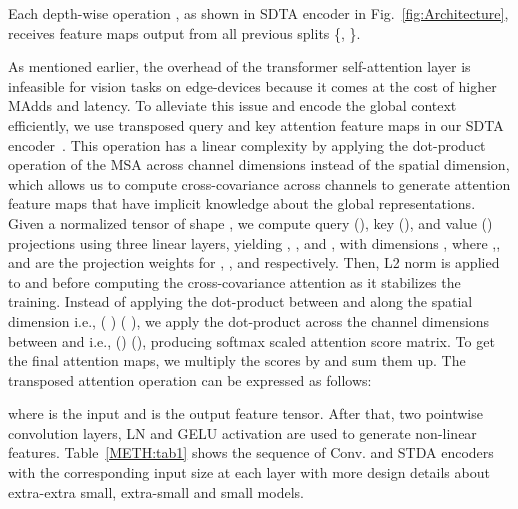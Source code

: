 \documentclass[runningheads]{llncs}
\begin{document}
Each depth-wise operation , as shown in SDTA encoder in Fig.~\ref{fig:Architecture}, receives feature maps output from all previous splits \{,   \}.

As mentioned earlier, the overhead of the transformer self-attention layer is infeasible for vision tasks on edge-devices because it comes at the cost of higher MAdds and latency. To alleviate this issue and encode the global context efficiently, we use transposed query and key attention feature maps in our SDTA encoder~\cite{ali2021xcit}. This operation has a linear complexity by applying the dot-product operation of the MSA across channel dimensions instead of the spatial dimension, which allows us to compute cross-covariance across channels to generate attention feature maps that have implicit knowledge about the global representations. Given a normalized tensor  of shape , we compute query (), key (), and value () projections using three linear layers, yielding , , and  , with dimensions , where ,, and  are the projection weights for , , and  respectively. Then, L2 norm is applied to  and  before computing the cross-covariance attention as it stabilizes the training. Instead of applying the dot-product between  and  along the spatial dimension i.e., (  )  (  ), we apply the dot-product across the channel dimensions between  and   i.e., ()  (), producing  softmax scaled attention score matrix. To get the final attention maps, we multiply the scores by  and sum them up. The transposed attention operation can be expressed as follows:


where  is the input and  is the output feature tensor. After that, two  pointwise convolution layers, LN and GELU activation are used to generate non-linear features. Table~\ref{METH:tab1} shows the sequence of Conv. and STDA encoders with the corresponding input size at each layer with more design details about extra-extra small, extra-small and small models.
\end{document}
